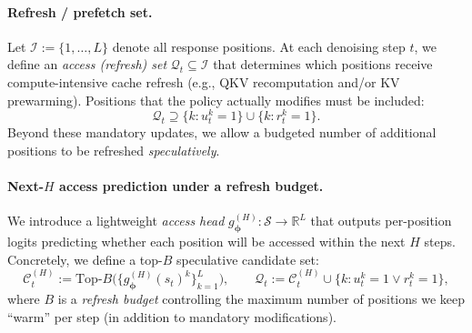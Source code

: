 \documentclass[11pt]{article}
\newcommand{\R}{\mathbb{R}}
\newcommand{\cS}{\mathcal{S}}
\newcommand{\cQ}{\mathcal{Q}}
\newcommand{\cC}{\mathcal{C}}
\newcommand{\cI}{\mathcal{I}}
\newcommand{\bphi}{\bm{\phi}}
\begin{document}
\paragraph{Refresh / prefetch set.}
Let $\cI := \{1,\dots,L\}$ denote all response positions.
At each denoising step $t$, we define an \emph{access (refresh) set} $\cQ_t \subseteq \cI$ that determines which positions receive compute-intensive cache refresh (e.g., QKV recomputation and/or KV prewarming).
Positions that the policy actually modifies must be included:
\begin{equation}
    \cQ_t \supseteq \{k : u_t^k = 1\} \cup \{k : r_t^k = 1\}.
    \label{eq:Qt_mandatory}
\end{equation}
Beyond these mandatory updates, we allow a budgeted number of additional positions to be refreshed \emph{speculatively}.

\paragraph{Next-$H$ access prediction under a refresh budget.}
We introduce a lightweight \emph{access head} $g_{\bphi}^{(H)}:\cS \to \R^L$ that outputs per-position logits predicting whether each position will be accessed within the next $H$ steps.
Concretely, we define a top-$B$ speculative candidate set:
\begin{equation}
    \cC_t^{(H)} := \text{Top-}B\bigl(\{g_{\bphi}^{(H)}(s_t)^k\}_{k=1}^L\bigr),
    \qquad
    \cQ_t := \cC_t^{(H)} \cup \{k : u_t^k = 1 \lor r_t^k = 1\},
    \label{eq:Qt_candidates}
\end{equation}
where $B$ is a \emph{refresh budget} controlling the maximum number of positions we keep ``warm'' per step (in addition to mandatory modifications).
\end{document}
